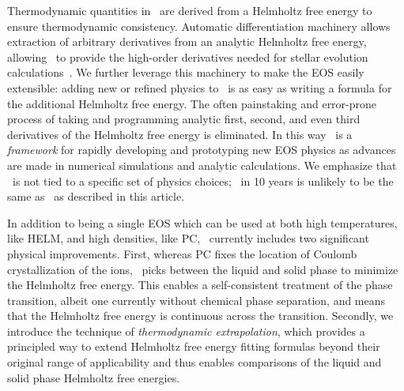 Thermodynamic quantities in \skye\ are derived from a Helmholtz free energy to ensure thermodynamic consistency.
Automatic differentiation machinery allows extraction of arbitrary derivatives from an analytic Helmholtz free energy, allowing \skye\ to provide the high-order derivatives needed for stellar evolution calculations~\citep[e.g.,][]{Paxton2011}.
We further leverage this machinery to make the EOS easily extensible: adding new or refined physics to \skye\ is as easy as writing a formula for the additional Helmholtz free energy. The often painstaking and error-prone process of taking and programming analytic first, second, and even third derivatives of the Helmholtz free energy is eliminated. 
In this way \skye\ is a \emph{framework} for rapidly developing and prototyping new EOS physics as advances are made in numerical simulations and analytic calculations. We emphasize that \skye\ is not tied to a specific set of physics choices; \skye\ in 10 years is unlikely to be the same as \skye\ as described in this article.

In addition to being a single EOS which can be used at both high temperatures, like HELM, and high densities, like PC, \skye\ currently includes two significant physical improvements.
First, whereas PC fixes the location of Coulomb crystallization of the ions, \skye\ picks between the liquid and solid phase to minimize the Helmholtz free energy.
This enables a self-consistent treatment of the phase transition, albeit one currently without chemical phase separation, and means that the Helmholtz free energy is continuous across the transition.
Secondly, we introduce the technique of \emph{thermodynamic extrapolation}, 
which provides a principled way to extend Helmholtz free energy fitting formulas beyond their original range of applicability
and thus enables comparisons of the liquid and solid phase Helmholtz free energies.

